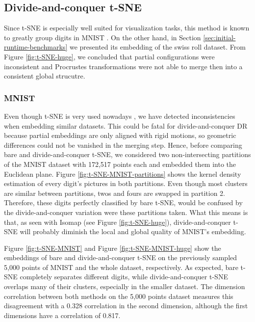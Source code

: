 \subsection{Divide-and-conquer t-SNE}
\label{sec:dc-t-SNE}

Since t-SNE is especially well suited for visualization tasks, this method is known to greatly group digits in MNIST \citep{Vandermaaten2008}. On the other hand, in Section \ref{sec:initial-runtime-benchmarks} we presented its embedding of the swiss roll dataset. From Figure \ref{fig:t-SNE-huge}, we concluded that partial configurations were inconsistent and Procrustes transformations were not able to merge then into a consistent global strucutre.

\subsubsection{MNIST}

Even though t-SNE is very used nowadays \citep{Wattenberg2016}, we have detected inconsistencies when embedding similar datasets. This could be fatal for divide-and-conquer DR because partial embeddings are only aligned with rigid motions, so geometric differences could not be vanished in the merging step. Hence, before comparing bare and divide-and-conquer t-SNE, we considered two non-intersecting partitions of the MNIST dataset with 172,517 points each and embedded them into the Euclidean plane. Figure \ref{fig:t-SNE-MNIST-partitions} shows the kernel density estimation of every digit's pictures in both partitions. Even though most clusters are similar between partitions, twos and fours are swapped in partition 2. Therefore, these digits perfectly classified by bare t-SNE, would be confused by the divide-and-conquer variation were these partitions taken. What this means is that, as seen with Isomap (see Figure \ref{fig:t-SNE-huge}), divide-and-conquer t-SNE will probably diminish the local and global quality of MNIST's embedding.

Figure \ref{fig:t-SNE-MNIST} and Figure \ref{fig:t-SNE-MNIST-huge} show the embeddings of bare and divide-and-conquer t-SNE on the previously sampled 5,000 points of MNIST and the whole dataset, respectively. As expected, bare t-SNE completely separates different digits, while divide-and-conquer t-SNE overlaps many of their clusters, especially in the smaller dataset. The dimension correlation between both methods on the 5,000 points dataset measures this disagreement with a 0.328 correlation in the second dimension, although the first dimensions have a correlation of 0.817.

